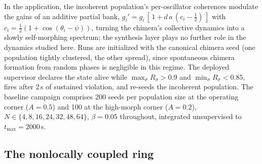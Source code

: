 \documentclass[pdflatex,sn-mathphys,Numbered]{sn-jnl}
\begin{document}
In the application, the incoherent population's per-oscillator coherences modulate
the gains of an additive partial bank, $g_i' = g_i\,[\,1 + d\,a\,(c_i - \tfrac12)\,]$
with $c_i = \tfrac12(1 + \cos(\theta_i - \psi))$, turning the chimera's collective
dynamics into a slowly self-morphing spectrum; the synthesis layer plays no further
role in the dynamics studied here. Runs are initialized with the canonical chimera
seed (one population tightly clustered, the other spread), since spontaneous chimera
formation from random phases is negligible in this regime. The deployed supervisor
declares the state alive while $\max_\sigma R_\sigma > 0.9$ and
$\min_\sigma R_\sigma < 0.85$, fires after 2\,s of sustained violation, and re-seeds
the incoherent population. The baseline campaign comprises 200 seeds per population
size at the operating corner ($A = 0.5$) and 100 at the high-morph corner
($A = 0.2$), $N \in \{4, 8, 16, 24, 32, 48, 64\}$, $\beta = 0.05$ throughout,
integrated unsupervised to $t_{\max} = 2000$\,s.

\subsection{The nonlocally coupled ring}\label{sec:system:ring}
\end{document}
